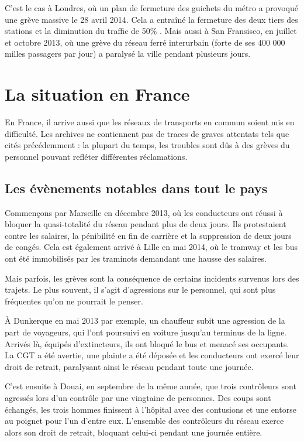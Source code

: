 	C'est le cas à Londres, où un plan de fermeture des guichets du métro a provoqué une grève massive le 28 avril 2014. Cela a entraîné la fermeture des deux tiers des stations et la diminution du traffic de 50\% \cite{tubeApril}. Mais aussi à San Fransisco, en juillet et octobre 2013, où une grève du réseau ferré interurbain (forte de ses 400 000 milles passagers par jour) a paralysé la ville pendant plusieurs jours. \cite{SFbart}

	\section{La situation en France}
	
	En France, il arrive aussi que les réseaux de transports en commun soient mis en difficulté. Les archives ne contiennent pas de traces de graves attentats tels que cités précédemment : la plupart du temps, les troubles sont dûs à des grèves du personnel pouvant refléter différentes réclamations.
	
	\subsection{ Les évènements notables dans tout le pays }

	Commençons par Marseille en décembre 2013, où les conducteurs ont réussi à bloquer la quasi-totalité du réseau pendant plus de deux jours. Ils protestaient contre les salaires, la pénibilité en fin de carrière et la suppression de deux jours de congés. Cela est également arrivé à Lille en mai 2014, où le tramway et les bus ont été immobilisés par les traminots demandant une hausse des salaires.

	Mais parfois, les grèves sont la conséquence de certains incidents survenus lors des trajets. Le plus souvent, il s'agit d'agressions sur le personnel, qui sont plus fréquentes qu'on ne pourrait le penser.

	À Dunkerque en mai 2013 par exemple, un chauffeur subit une agression de la part de voyageurs, qui l'ont poursuivi en voiture jusqu'au terminus de la ligne. Arrivés là, équipés d'extincteurs, ils ont bloqué le bus et menacé ses occupants. La CGT a été avertie, une plainte a été déposée et les conducteurs ont exercé leur droit de retrait, paralysant ainsi le réseau pendant toute une journée.

	C'est ensuite à Douai, en septembre de la même année, que trois contrôleurs sont agressés lors d'un contrôle par une vingtaine de personnes. Des coups sont échangés, les trois hommes finissent à l'hôpital avec des contusions et une entorse au poignet pour l'un d'entre eux. L'ensemble des contrôleurs du réseau exerce alors son droit de retrait, bloquant celui-ci pendant une journée entière.

